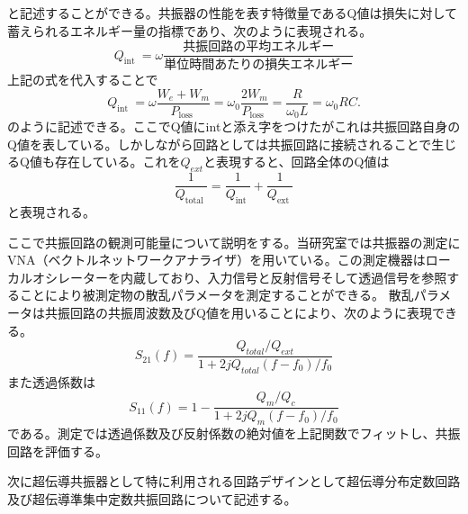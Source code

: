        と記述することができる。共振器の性能を表す特徴量であるQ値は損失に対して蓄えられるエネルギー量の指標であり、次のように表現される。
        \begin{equation}
            Q_{\text {int }}=\omega \frac{共振回路の平均エネルギー}{単位時間あたりの損失エネルギー}
        \end{equation}
        上記の式を代入することで
        \begin{equation}
            Q_{\text {int }}=\omega \frac{W_{e}+W_{m}}{P_{\text {loss }}}=\omega_{0} \frac{2 W_{m}}{P_{\text {loss }}}=\frac{R}{\omega_{0} L}=\omega_{0} R C .
        \end{equation}
        のように記述できる。ここでQ値にintと添え字をつけたがこれは共振回路自身のQ値を表している。しかしながら回路としては共振回路に接続されることで生じるQ値も存在している。これを$Q_{ext}$と表現すると、回路全体のQ値は
        \begin{equation}
            \frac{1}{Q_{\text {total }}}=\frac{1}{Q_{\text {int }}}+\frac{1}{Q_{\text {ext }}}
        \end{equation}
        と表現される。

        ここで共振回路の観測可能量について説明をする。当研究室では共振器の測定にVNA（ベクトルネットワークアナライザ）を用いている。この測定機器はローカルオシレーターを内蔵しており、入力信号と反射信号そして透過信号を参照することにより被測定物の散乱パラメータを測定することができる。
        散乱パラメータは共振回路の共振周波数及びQ値を用いることにより、次のように表現できる。
        \begin{equation}
            S_{21}(f)=\frac{Q_{total} / Q_{ext}}{1+2 j Q_{total}\left(f-f_{0}\right) / f_{0}}
        \end{equation}
        また透過係数は
        \begin{equation}
            S_{11}(f)=1-\frac{Q_{m} / Q_{c}}{1+2 j Q_{m}\left(f-f_{0}\right) / f_{0}}
        \end{equation}
        である。測定では透過係数及び反射係数の絶対値を上記関数でフィットし、共振回路を評価する。

        次に超伝導共振器として特に利用される回路デザインとして超伝導分布定数回路及び超伝導準集中定数共振回路について記述する。
